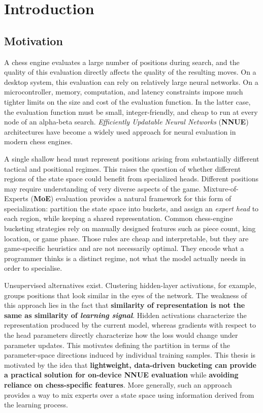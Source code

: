 \chapter{Introduction}\label{ch:introduction}

\section{Motivation}\label{sec:motivation}

A chess engine evaluates a large number of positions during search, and the quality of this evaluation directly affects the quality of the resulting moves. On a desktop system, this evaluation can rely on relatively large neural networks. On a microcontroller, memory, computation, and latency constraints impose much tighter limits on the size and cost of the evaluation function. In the latter case, the evaluation function must be small, integer-friendly, and cheap to run at every node of an alpha-beta search. \emph{Efficiently Updatable Neural Networks} (\textbf{NNUE}) architectures have become a widely used approach for neural evaluation in modern chess engines.

A single shallow head must represent positions arising from substantially different tactical and positional regimes. This raises the question of whether different regions of the state space could benefit from specialized heads. Different positions may require understanding of very diverse aspects of the game. Mixture-of-Experts (\textbf{MoE}) evaluation provides a natural framework for this form of specialization: partition the state space into buckets, and assign an \emph{expert head} to each region, while keeping a shared representation. Common chess-engine bucketing strategies rely on manually designed features such as piece count, king location, or game phase. Those rules are cheap and interpretable, but they are game-specific heuristics and are not necessarily optimal. They encode what a programmer thinks is a distinct regime, not what the model actually needs in order to specialise.

Unsupervised alternatives exist. Clustering hidden-layer activations, for example, groups positions that look similar in the eyes of the network. The weakness of this approach lies in the fact that \textbf{similarity of representation is not the same as similarity of \emph{learning signal}}. Hidden activations characterize the representation produced by the current model, whereas gradients with respect to the head parameters directly characterize how the loss would change under parameter updates. This motivates defining the partition in terms of the parameter-space directions induced by individual training samples. This thesis is motivated by the idea that \textbf{lightweight, data-driven bucketing can provide a practical solution for on-device NNUE evaluation} while \textbf{avoiding reliance on chess-specific features}. More generally, such an approach provides a way to mix experts over a state space using information derived from the learning process.

